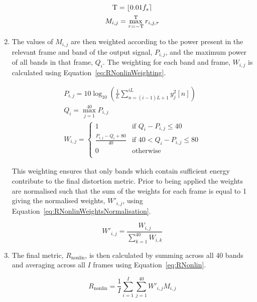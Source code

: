\begin{enumerate}
					\begin{gather}
						\mathrm{T} = \left\lfloor0.01f_{s}\right\rceil \nonumber \\
						M_{i,j} = \max_{\tau = -\mathrm{T}}^{\mathrm{T}} r_{i,j,\tau}
						\label{eq:RNonlinMaxCrossCorrelation}
					\end{gather}

				\item The values of $M_{i,j}$ are then weighted according to the power present in the
					relevant frame and band of the output signal, $P_{i,j}$, and the maximum power of
					all bands in that frame, $Q_{i}$. The weighting for each band and frame, $W_{i,j}$
					is calculated using Equation~\ref{eq:RNonlinWeighting}.

					\begin{gather}
						P_{i,j} = 10\log_{10} \left( \frac{1}{L} 
							\sum_{n=(i-1)L+1}^{iL} y_{j}^{2}[n]\right) \nonumber \\
						Q_{i} = \max_{j = 1}^{40} P_{i,j} \nonumber \\
						W_{i,j} = \begin{cases}
							1 & \text{if $Q_{i} - P_{i,j} \leq 40$} \\
							\frac{P_{i,j} - Q_{i} + 80}{40} & 
								\text{if $40 < Q_{i} - P_{i,j} \leq 80$} \\
							0 & \text{otherwise} \\
						\end{cases}
						\label{eq:RNonlinWeighting}
					\end{gather}

					This weighting ensures that only bands which contain sufficient energy contribute
					to the final distortion metric. Prior to being applied the weights are normalised
					such that the sum of the weights for each frame is equal to 1 giving the normalised
					weights, $W'_{i,j}$, using Equation~\ref{eq:RNonlinWeightsNormalisation}.

					\begin{equation}
						W'_{i,j} = \frac{W_{i, j}}{\sum_{k = 1}^{40} W_{i,k}}
						\label{eq:RNonlinWeightsNormalisation}
					\end{equation}

				\item The final metric, $R_{\mathrm{nonlin}}$, is then calculated by summing across all 40
					bands and averaging across all $I$ frames using Equation~\ref{eq:RNonlin}.

					\begin{equation}
						R_{\mathrm{nonlin}} = \frac{1}{I} \sum_{i = 1}^{I} \sum_{j = 1}^{40} 
									W'_{i,j}M_{i,j}
						\label{eq:RNonlin}
					\end{equation}

			\end{enumerate}

